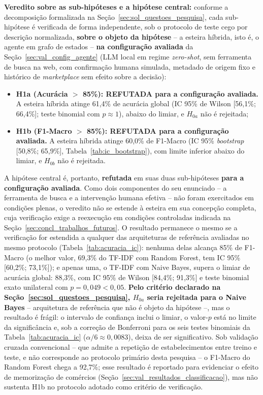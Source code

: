 \textbf{Veredito sobre as sub-hipóteses e a hipótese central:} conforme a decomposição formalizada na Seção~\ref{sec:sol_questoes_pesquisa}, cada sub-hipótese é verificada de forma independente, sob o protocolo de teste cego por descrição normalizada, \textbf{sobre o objeto da hipótese} -- a esteira híbrida, isto é, o agente em grafo de estados -- \textbf{na configuração avaliada} da Seção~\ref{sec:val_config_agente} (LLM local em regime \textit{zero-shot}, sem ferramenta de busca na web, com confirmação humana simulada, metadado de origem fixo e histórico de \textit{marketplace} sem efeito sobre a decisão):
\begin{itemize}
	\item \textbf{H1a (Acurácia $>$ 85\%): REFUTADA para a configuração avaliada.} A esteira híbrida atinge 61,4\% de acurácia global (IC 95\% de Wilson [56,1\%; 66,4\%]; teste binomial com $p \approx 1$), abaixo do limiar, e $H_{0a}$ não é rejeitada;
	\item \textbf{H1b (F1-Macro $>$ 85\%): REFUTADA para a configuração avaliada.} A esteira híbrida atinge 60,0\% de F1-Macro (IC 95\% \textit{bootstrap} [50,8\%; 65,9\%], Tabela~\ref{tab:ic_bootstrap}), com limite inferior abaixo do limiar, e $H_{0b}$ não é rejeitada.
\end{itemize}
A hipótese central é, portanto, \textbf{refutada} em suas duas sub-hipóteses \textbf{para a configuração avaliada}. Como dois componentes do seu enunciado -- a ferramenta de busca e a intervenção humana efetiva -- não foram exercitados em condições plenas, o veredito não se estende à esteira em sua concepção completa, cuja verificação exige a reexecução em condições controladas indicada na Seção~\ref{sec:concl_trabalhos_futuros}. O resultado permanece o mesmo se a verificação for estendida a qualquer das arquiteturas de referência avaliadas no mesmo protocolo (Tabela~\ref{tab:acuracia_ic}): nenhuma delas alcança 85\% de F1-Macro (o melhor valor, 69,3\% do TF-IDF com Random Forest, tem IC 95\% [60,2\%; 73,1\%]); e apenas uma, o TF-IDF com Naive Bayes, supera o limiar de acurácia global: 88,3\%, com IC 95\% de Wilson [84,4\%; 91,3\%] e teste binomial exato unilateral com $p = 0{,}049 < 0{,}05$. \textbf{Pelo critério declarado na Seção~\ref{sec:sol_questoes_pesquisa}, $H_{0a}$ seria rejeitada para o Naive Bayes} -- arquitetura de referência que não é objeto da hipótese --, mas o resultado é frágil: o intervalo de confiança inclui o limiar, o valor-$p$ está no limite da significância e, sob a correção de Bonferroni para os seis testes binomiais da Tabela~\ref{tab:acuracia_ic} ($\alpha/6 \approx 0{,}0083$), deixa de ser significativo. Sob validação cruzada convencional -- que admite a repetição de estabelecimentos entre treino e teste, e não corresponde ao protocolo primário desta pesquisa -- o F1-Macro do Random Forest chega a 92,7\%; esse resultado é reportado para evidenciar o efeito de memorização de comércios (Seção~\ref{sec:val_resultados_classificacao}), mas não sustenta H1b no protocolo adotado como critério de verificação.

